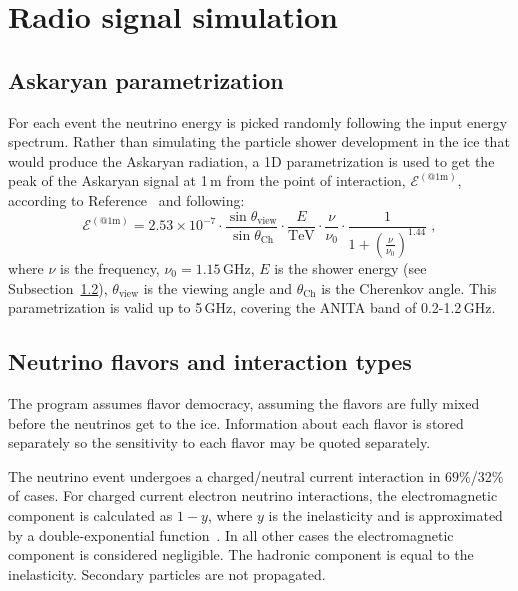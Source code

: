 \section{Radio signal simulation} 
\label{sec:rf}

\subsection{Askaryan parametrization}
For each event the neutrino energy is picked randomly following the input energy spectrum.
Rather than simulating the particle shower development in the ice that
would produce the Askaryan radiation, a 1D parametrization is used 
to get the peak of the Askaryan signal at 1\,m from the point of interaction, $\mathcal{E}^{(\mathrm{@ 1m})}$, 
according to Reference~\cite{JaimeAskarian2000} and following:
\begin{equation}
\label{eq:vmmhz}
\mathcal{E}^{(\mathrm{@ 1m})} =2.53\times 10^{-7}\cdot \frac{\sin{\theta_{\mathrm{view}}}}{\sin{\theta_{\mathrm{Ch}}}}\cdot  \frac{E}{\mathrm{TeV}} \cdot \frac{\nu}{\nu_0} \cdot \frac{1}{1+\left( \frac{\nu}{\nu_0} \right)^{1.44}} \;,
\end{equation}
\noindent where $\nu$ is the frequency, $\nu_0=1.15$\,GHz, $E$ is
the shower energy (see Subsection~\ref{subsec:emhadshower}),
$\theta_{\mathrm{view}}$ is the viewing angle and $\theta_{\mathrm{Ch}}$ is the Cherenkov angle.
This parametrization is valid up to 5\,GHz, covering the ANITA
band of 0.2-1.2\,GHz.

\subsection{Neutrino flavors and interaction types}
\label{subsec:emhadshower}
The \icemc program assumes flavor democracy, assuming 
the flavors are fully mixed before the neutrinos get to the ice.
Information about each flavor is stored separately so the sensitivity to each flavor may be quoted separately.

The neutrino event undergoes a charged/neutral current interaction in
$69\%$/32\% of cases.
For charged current electron neutrino interactions, the electromagnetic
component is calculated as $1-y$, where $y$ is the inelasticity and is
approximated by a double-exponential function~\cite{gandhi}. 
In all other cases the electromagnetic component is considered negligible.
The hadronic component is equal to the inelasticity.
Secondary particles are not propagated.


